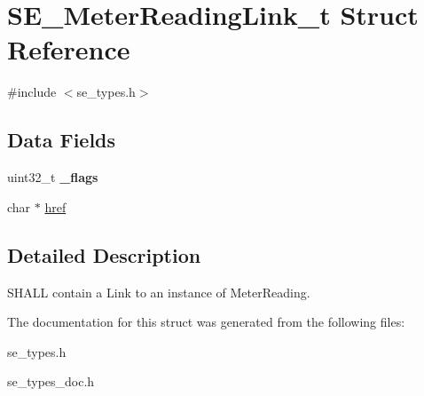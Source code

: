 \hypertarget{structSE__MeterReadingLink__t}{}\section{S\+E\+\_\+\+Meter\+Reading\+Link\+\_\+t Struct Reference}
\label{structSE__MeterReadingLink__t}


{\ttfamily \#include $<$se\+\_\+types.\+h$>$}

\subsection*{Data Fields}
\begin{DoxyCompactItemize}
\item 
uint32\+\_\+t {\bfseries \+\_\+flags}
\item 
char $\ast$ \hyperlink{group__MeterReadingLink_gadbcaaeedbf94ec78074abb19f52acc8b}{href}
\end{DoxyCompactItemize}


\subsection{Detailed Description}
S\+H\+A\+LL contain a Link to an instance of Meter\+Reading. 

The documentation for this struct was generated from the following files\+:\begin{DoxyCompactItemize}
\item 
se\+\_\+types.\+h\item 
se\+\_\+types\+\_\+doc.\+h\end{DoxyCompactItemize}
